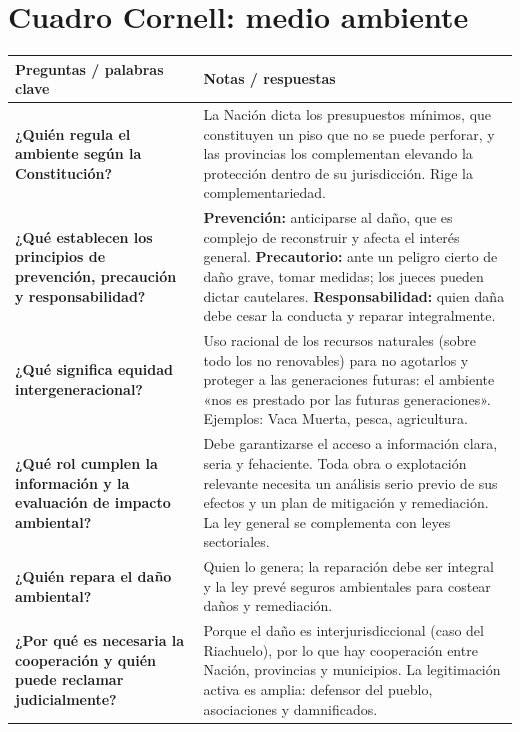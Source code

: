 \documentclass[12pt,oneside]{book}
\newlength{\cornellizq}
\newlength{\cornellder}
\begin{document}
\section{Cuadro Cornell: medio ambiente}

\begin{longtable}{
    >{\raggedright\arraybackslash}p{\cornellizq}
    >{\raggedright\arraybackslash}p{\cornellder}
}
\toprule
\textbf{Preguntas / palabras clave} & \textbf{Notas / respuestas} \\
\midrule
\endhead

\textbf{¿Quién regula el ambiente según la Constitución?} &
La Nación dicta los presupuestos mínimos, que constituyen un piso que no se puede perforar, y las provincias los complementan elevando la protección dentro de su jurisdicción. Rige la complementariedad. \\[0.8em]

\textbf{¿Qué establecen los principios de prevención, precaución y responsabilidad?} &
\textbf{Prevención:} anticiparse al daño, que es complejo de reconstruir y afecta el interés general. \textbf{Precautorio:} ante un peligro cierto de daño grave, tomar medidas; los jueces pueden dictar cautelares. \textbf{Responsabilidad:} quien daña debe cesar la conducta y reparar integralmente. \\[0.8em]

\textbf{¿Qué significa equidad intergeneracional?} &
Uso racional de los recursos naturales (sobre todo los no renovables) para no agotarlos y proteger a las generaciones futuras: el ambiente «nos es prestado por las futuras generaciones». Ejemplos: Vaca Muerta, pesca, agricultura. \\[0.8em]

\textbf{¿Qué rol cumplen la información y la evaluación de impacto ambiental?} &
Debe garantizarse el acceso a información clara, seria y fehaciente. Toda obra o explotación relevante necesita un análisis serio previo de sus efectos y un plan de mitigación y remediación. La ley general se complementa con leyes sectoriales. \\[0.8em]

\textbf{¿Quién repara el daño ambiental?} &
Quien lo genera; la reparación debe ser integral y la ley prevé seguros ambientales para costear daños y remediación. \\[0.8em]

\textbf{¿Por qué es necesaria la cooperación y quién puede reclamar judicialmente?} &
Porque el daño es interjurisdiccional (caso del Riachuelo), por lo que hay cooperación entre Nación, provincias y municipios. La legitimación activa es amplia: defensor del pueblo, asociaciones y damnificados. \\


\end{longtable}
\end{document}
